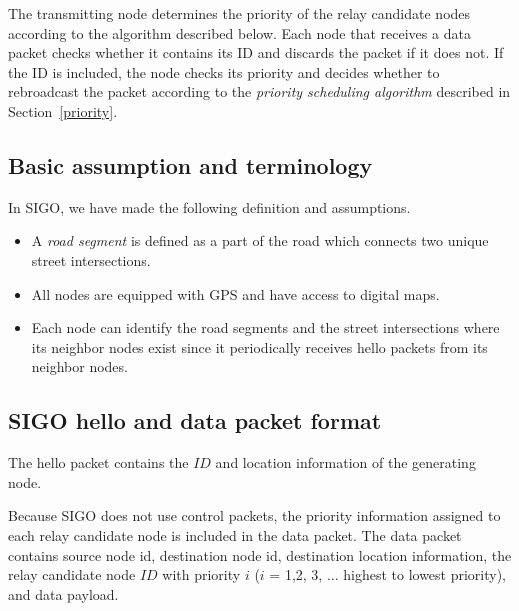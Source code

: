 \documentclass[conference]{IEEEtran}
\begin{document}
The transmitting node determines the priority of the relay candidate nodes according to the algorithm described 
below. Each node that receives a data packet checks whether it contains its ID and discards the packet if it does not. If the ID is included, the node checks its priority and decides whether to rebroadcast the packet according to the \textit{priority scheduling algorithm} described in \mbox{Section \ref{priority}}.

\subsection{Basic assumption and terminology}
In SIGO, we have made the following definition and assumptions.
\begin{itemize}
\item A \textit{road segment} is defined as a part of the road which connects two unique street intersections.
\item All nodes are equipped with GPS and have access to digital maps.
\item Each node can identify the road segments and the street intersections where its neighbor nodes exist since it
periodically receives hello packets from its neighbor nodes.
\end{itemize}


\subsection{SIGO hello and data packet format}
The hello packet contains the $ID$ and location information of the generating node.

Because SIGO does not use control packets, the priority information assigned to each relay candidate node is included in the data packet.
The data packet contains source node id, destination node id, destination location information, the relay candidate node $ID$ with priority $i$ ($ i$ = 1,2, 3, ... highest to lowest priority), and data payload.

\end{document}
